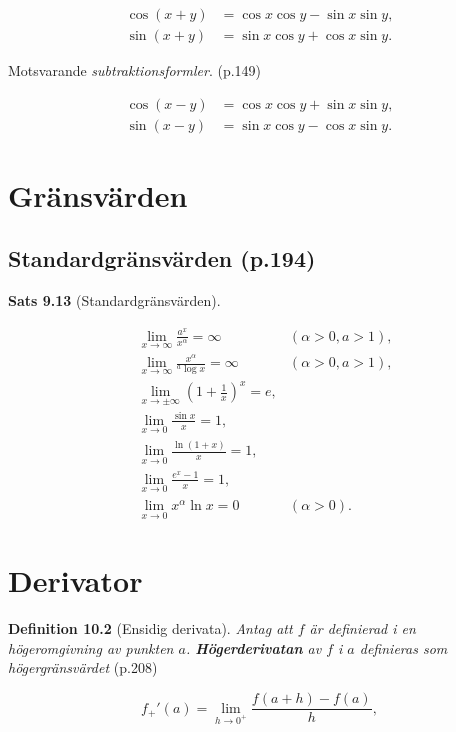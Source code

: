 \documentclass[11pt]{article}
\begin{document}
\begin{align}
    \cos(x + y) &= \cos x \cos y - \sin x \sin y,\\
    \sin(x + y) &= \sin x \cos y + \cos x \sin y.
\end{align}

Motsvarande \textit{subtraktionsformler}. (p.149)

\begin{align}
    \cos(x - y) &= \cos x \cos y + \sin x \sin y,\\
    \sin(x - y) &= \sin x \cos y - \cos x \sin y.
\end{align}

\newpage
\section{Gränsvärden}

\subsection{Standardgränsvärden (p.194)}

\textbf{Sats 9.13} (Standardgränsvärden).

\begin{align}
    &\lim_{x \to \infty} \frac{a^x}{x^\alpha} = \infty \quad &(\alpha > 0, a > 1),\\
    &\lim_{x \to \infty} \frac{x^\alpha}{{}^a\log x} = \infty \quad &(\alpha > 0, a > 1),\\
    &\lim_{x \to \pm \infty} \left( 1 + \frac{1}{x} \right)^x = e,\\
    &\lim_{x \to 0} \frac{\sin x}{x} = 1,\\
    &\lim_{x \to 0} \frac{\ln(1 + x)}{x} = 1,\\
    &\lim_{x \to 0} \frac{e^x - 1}{x} = 1,\\
    &\lim_{x \to 0} x^\alpha \ln x = 0 \quad &(\alpha > 0).
\end{align}

\section{Derivator}

\textbf{Definition 10.2} (Ensidig derivata). \textit{Antag att $f$ är definierad i en högeromgivning av punkten $a$. \textbf{Högerderivatan} av $f$ i $a$ definieras som högergränsvärdet} (p.208)

\begin{equation}
    f_+'(a) = \lim_{h \to 0^+} \frac{f(a + h) - f(a)}{h},
\end{equation}
\end{document}
